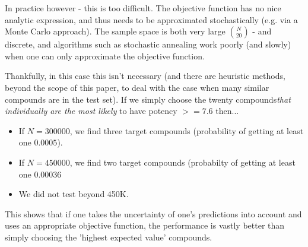 \documentclass[journal=jacsat,manuscript=article]{achemso}
\begin{document}
In practice however - this is too difficult.  The objective function has no nice analytic expression, and thus needs to be approximated stochastically (e.g. via a Monte Carlo approach).  The sample space is both very large ${N}\choose{20}$ - and discrete, and algorithms such as stochastic annealing work poorly (and slowly) when one can only approximate the objective function.

Thankfully, in this case this isn't necessary (and there are heuristic methods, beyond the scope of this paper, to deal with the case when many similar compounds are in the test set).  If we simply choose the twenty compounds\textit{that individually are the most likely} to have potency $>= 7.6$ then...

\begin{itemize}
    \item If $N=300000$, we find three target compounds (probability of getting at least one $0.0005$).
    \item If $N=450000$, we find two target compounds (probabilty of getting at least one $0.00036$
    \item We did not test beyond 450K.
\end{itemize}

This shows that if one takes the uncertainty of one's predictions into account and uses an appropriate objective function, the performance is vastly better than simply choosing the 'highest expected value' compounds.

\end{document}

